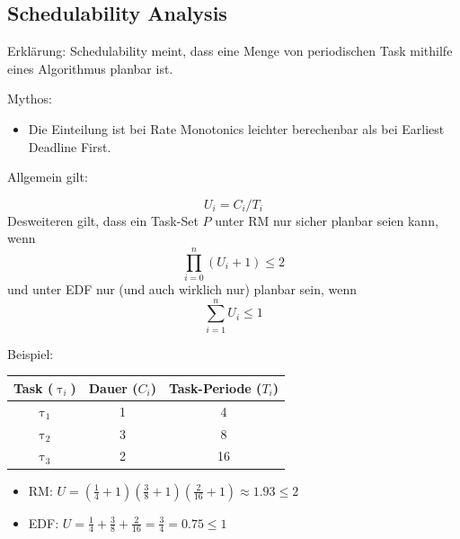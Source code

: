 

\subsection{Schedulability Analysis}\label{SchedulabilityAnalaysis}
\begin{frame}{Erklärung:}
	Schedulability meint, dass eine Menge von periodischen Task mithilfe eines Algorithmus planbar ist.
\end{frame}
\begin{frame}{Mythos:}
	\begin{itemize}
		\item Die Einteilung ist bei Rate Monotonics leichter berechenbar als bei Earliest Deadline First.
	\end{itemize}
\end{frame}

\begin{frame}{Allgemein gilt:}
	
	\begin{equation}
		U_i = C_i / T_i
	\end{equation}
	Desweiteren gilt, dass ein Task-Set $P$ unter RM nur sicher planbar seien kann, wenn
	\begin{equation}
		\prod_{i=0}^n (U_i +1) \leq 2
	\end{equation}
	und unter EDF nur (und auch wirklich nur) planbar sein, wenn
	\begin{equation}
		\sum_{i=1}^n U_i \leq 1
	\end{equation}
\end{frame}

\begin{frame}{Beispiel:}
	\begin{center}
		\begin{tabular}{c||c|c}
			Task ($\uptau_i$) & Dauer ($C_i$) & Task-Periode ($T_i$)\\\hline\hline
			$\uptau_1$ & 1 & 4\\
			$\uptau_2$ & 3 & 8\\
			$\uptau_3$ & 2 & 16
		\end{tabular}	
		\begin{itemize}
			\item RM: $U = (\frac{1}{4}+1)(\frac{3}{8}+1)(\frac{2}{16}+1)\approx 1.93 \leq 2$
			\item EDF: $U = \frac{1}{4} + \frac{3}{8} + \frac{2}{16} = \frac{3}{4} = 0.75 \leq 1$
		\end{itemize}
	\end{center}

\end{frame}

